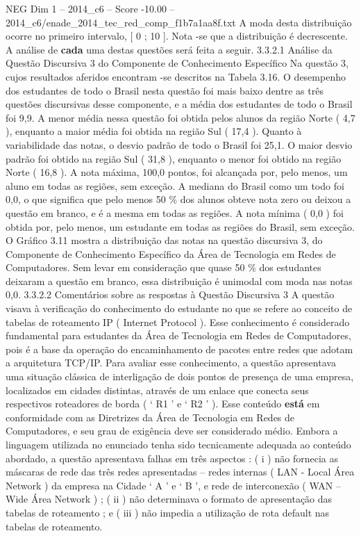 \begin{textsample}{NEG Dim 1 – 2014\_c6 – Score -10.00 – 2014\_c6/enade\_2014\_tec\_red\_comp\_f1b7a1aa8f.txt}
A moda desta distribuição ocorre no primeiro intervalo, [ 0 ; 10 ].
Nota -se que a distribuição é decrescente.
A análise de \textbf{cada} uma destas questões será feita a seguir. 3.3.2.1 Análise da Questão Discursiva 3 do Componente de Conhecimento Específico Na questão 3, cujos resultados aferidos encontram -se descritos na Tabela 3.16.
O desempenho dos estudantes de todo o Brasil nesta questão foi mais baixo dentre as três questões discursivas desse componente, e a média dos estudantes de todo o Brasil foi 9,9.
A menor média nessa questão foi obtida pelos alunos da região Norte ( 4,7 ), enquanto a maior média foi obtida na região Sul ( 17,4 ).
Quanto à variabilidade das notas, o desvio padrão de todo o Brasil foi 25,1.
O maior desvio padrão foi obtido na região Sul ( 31,8 ), enquanto o menor foi obtido na região Norte ( 16,8 ).
A nota máxima, 100,0 pontos, foi alcançada por, pelo menos, um aluno em todas as regiões, sem exceção.
A mediana do Brasil como um todo foi 0,0, o que significa que pelo menos 50 \% dos alunos obteve nota zero ou deixou a questão em branco, e é a mesma em todas as regiões.
A nota mínima ( 0,0 ) foi obtida por, pelo menos, um estudante em todas as regiões do Brasil, sem exceção.
O Gráfico 3.11 mostra a distribuição das notas na questão discursiva 3, do Componente de Conhecimento Específico da Área de Tecnologia em Redes de Computadores.
Sem levar em consideração que quase 50 \% dos estudantes deixaram a questão em branco, essa distribuição é unimodal com moda nas notas 0,0. 3.3.2.2 Comentários sobre as respostas à Questão Discursiva 3 A questão visava à verificação do conhecimento do estudante no que se refere ao conceito de tabelas de roteamento IP ( Internet Protocol ).
Esse conhecimento é considerado fundamental para estudantes da Área de Tecnologia em Redes de Computadores, pois é a base da operação do encaminhamento de pacotes entre redes que adotam a arquitetura TCP/IP.
Para avaliar esse conhecimento, a questão apresentava uma situação clássica de interligação de dois pontos de presença de uma empresa, localizados em cidades distintas, através de um enlace que conecta seus respectivos roteadores de borda ( ‘ R1 ’ e ‘ R2 ’ ).
Esse conteúdo \textbf{está} em conformidade com as Diretrizes da Área de Tecnologia em Redes de Computadores, e seu grau de exigência deve ser considerado médio.
Embora a linguagem utilizada no enunciado tenha sido tecnicamente adequada ao conteúdo abordado, a questão apresentava falhas em três aspectos : ( i ) não fornecia as máscaras de rede das três redes apresentadas – redes internas ( LAN - Local Área Network ) da empresa na Cidade ‘ A ’ e ‘ B ’, e rede de interconexão ( WAN – Wide Área Network ) ; ( ii ) não determinava o formato de apresentação das tabelas de roteamento ; e ( iii ) não impedia a utilização de rota default nas tabelas de roteamento.

\end{textsample}

